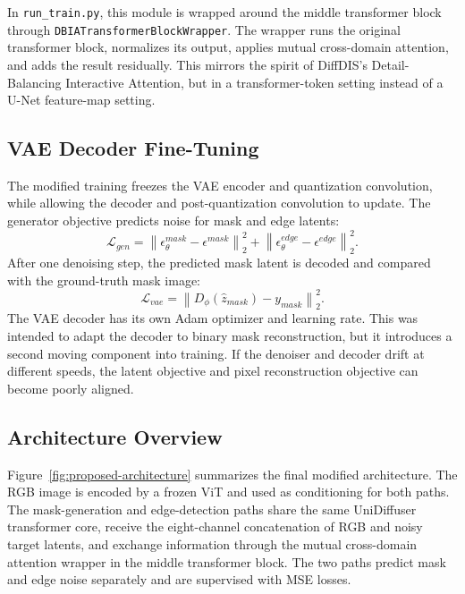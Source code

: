 \documentclass[sigconf,nonacm]{acmart}
\begin{document}
In \texttt{run\_train.py}, this module is wrapped around the middle transformer block through \texttt{DBIATransformerBlockWrapper}. The wrapper runs the original transformer block, normalizes its output, applies mutual cross-domain attention, and adds the result residually. This mirrors the spirit of DiffDIS's Detail-Balancing Interactive Attention, but in a transformer-token setting instead of a U-Net feature-map setting.

\subsection{VAE Decoder Fine-Tuning}
The modified training freezes the VAE encoder and quantization convolution, while allowing the decoder and post-quantization convolution to update. The generator objective predicts noise for mask and edge latents:
\begin{equation}
  \mathcal{L}_{gen} =
  \left\|\epsilon_{\theta}^{mask} - \epsilon^{mask}\right\|_2^2 +
  \left\|\epsilon_{\theta}^{edge} - \epsilon^{edge}\right\|_2^2 .
\end{equation}
After one denoising step, the predicted mask latent is decoded and compared with the ground-truth mask image:
\begin{equation}
  \mathcal{L}_{vae} =
  \left\|D_{\phi}(\hat{z}_{mask}) - y_{mask}\right\|_2^2 .
\end{equation}
The VAE decoder has its own Adam optimizer and learning rate. This was intended to adapt the decoder to binary mask reconstruction, but it introduces a second moving component into training. If the denoiser and decoder drift at different speeds, the latent objective and pixel reconstruction objective can become poorly aligned.

\subsection{Architecture Overview}
Figure~\ref{fig:proposed-architecture} summarizes the final modified architecture. The RGB image is encoded by a frozen ViT and used as conditioning for both paths. The mask-generation and edge-detection paths share the same UniDiffuser transformer core, receive the eight-channel concatenation of RGB and noisy target latents, and exchange information through the mutual cross-domain attention wrapper in the middle transformer block. The two paths predict mask and edge noise separately and are supervised with MSE losses.
\end{document}
